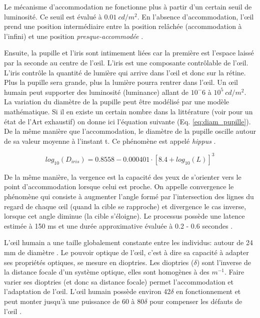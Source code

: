 	\par Le mécanisme d'accommodation ne fonctionne plus à partir d'un certain seuil de luminosité. Ce seuil est évalué à $0.01~cd/m^2$. En l'absence d'accommodation, l'œil prend une position intermédiaire entre la position relâchée (accommodation à l'infini) et une position \textit{presque-accommodée} \citep{gross_human_2008}.
	
	\par Ensuite, la pupille et l'iris sont intimement liées car la première est l'espace laissé par la seconde au centre de l'œil. L'iris est une composante contrôlable de l'œil. L'iris contrôle la quantité de lumière qui arrive dans l'œil et donc sur la rétine. Plus la pupille sera grande, plus la lumière pourra rentrer dans l'œil. Un œil humain peut supporter des luminosité (luminance) allant de $10^-6$ à $10^5~cd/m^2$. La variation du diamètre de la pupille peut être modélisé par une modèle mathématique. Si il en existe un certain nombre dans la littérature (voir \citep{watson_unified_2012} pour un état de l'Art exhaustif) on donne ici l'équation suivante (Eq. \ref{eq:diam_pupille}). De la même manière que l'accommodation, le diamètre de la pupille oscille autour de sa valeur moyenne à l'instant t. Ce phénomène est appelé \textit{hippus} \citep{gross_human_2008}.
	
	\begin{equation}
		log_{10}(D_{iris}) = 0.8558 - 0.000401 \cdot [8.4 + log_{10}(L)]^3
		\label{eq:diam_pupille}
	\end{equation}
	
	\par De la même manière, la vergence est la capacité des yeux de s'orienter vers le point d'accommodation lorsque celui est proche. On appelle convergence le phénomène qui consiste à augmenter l'angle formé par l'intersection des lignes du regard de chaque œil (quand la cible se rapproche) et divergence le cas inverse, lorsque cet angle diminue (la cible s'éloigne). Le processus possède une latence estimée à 150 ms et une durée approximative évaluée à 0.2 - 0.6 secondes \citep{devisme_optimisation_2004, gross_human_2008}.
	
	\par L'œil humain a une taille globalement constante entre les individus: autour de 24 mm de diamètre \citep{glassner_principles_1995}. Le pouvoir optique de l'œil, c'est à dire sa capacité à adapter ses propriétés optiques, se mesure en dioptries. Les dioptries ($\delta$) sont l'inverse de la distance focale d'un système optique, elles sont homogènes à des $m^{-1}$. Faire varier ses dioptries (et donc sa distance focale) permet l'accommodation et l'adaptation de l'œil. L'œil humain possède environ 42$\delta$ en fonctionnement et peut monter jusqu'à une puissance de 60 à 80$\delta$ pour compenser les défauts de l'œil \citep{glassner_principles_1995}.
	
